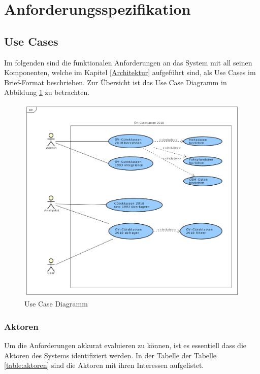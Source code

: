 
\section{Anforderungsspezifikation}
\label{Anforderungsspezifikation}

\subsection{Use Cases}
\label{Anforderungsspezifikation:Use Cases}

Im folgenden sind die funktionalen Anforderungen an das System mit all seinen Komponenten, welche im Kapitel \ref{Architektur} aufgeführt sind, als Use Cases im Brief-Format beschrieben. 
Zur Übersicht ist das Use Case Diagramm in Abbildung \ref{fig:UseCase_OeV-Gueteklassen_2018} zu betrachten.

\begin{figure}[ht]
\centering
\includegraphics[width=0.7\linewidth]{projectdoc/img/UseCase_OeV-Gueteklassen_2018}
\caption[Use Case Diagramm]{Use Case Diagramm}
\label{fig:UseCase_OeV-Gueteklassen_2018}
\end{figure}

\subsubsection{Aktoren}
\label{Use Cases:Aktoren}

Um die Anforderungen akkurat evaluieren zu können, ist es essentiell dass die Aktoren des Systems identifiziert werden. 
In der Tabelle der Tabelle \ref{table:aktoren} sind die Aktoren mit ihren Interessen aufgelistet. 

